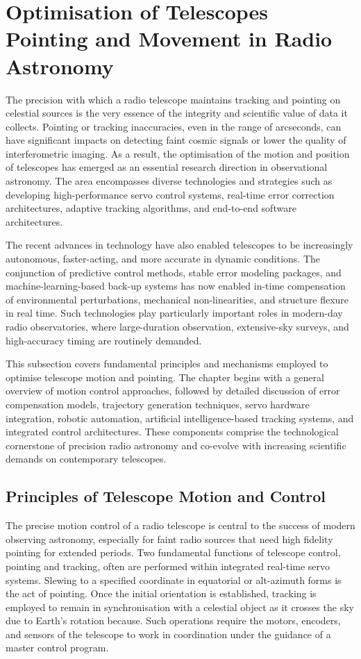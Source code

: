 \section{Optimisation of Telescopes Pointing and Movement in Radio Astronomy}
The precision with which a radio telescope maintains tracking and pointing on celestial sources is the very essence of the integrity and scientific value of data it collects. Pointing or tracking inaccuracies, even in the range of arcseconds, can have significant impacts on detecting faint cosmic signals or lower the quality of interferometric imaging. As a result, the optimisation of the motion and position of telescopes has emerged as an essential research direction in observational astronomy. The area encompasses diverse technologies and strategies such as developing high-performance servo control systems, real-time error correction architectures, adaptive tracking algorithms, and end-to-end software architectures.

The recent advances in technology have also enabled telescopes to be increasingly autonomous, faster-acting, and more accurate in dynamic conditions. The conjunction of predictive control methods, stable error modeling packages, and machine-learning-based back-up systems has now enabled in-time compensation of environmental perturbations, mechanical non-linearities, and structure flexure in real time. Such technologies play particularly important roles in modern-day radio observatories, where large-duration observation, extensive-sky surveys, and high-accuracy timing are routinely demanded.

This subsection covers fundamental principles and mechanisms employed to optimise telescope motion and pointing. The chapter begins with a general overview of motion control approaches, followed by detailed discussion of error compensation models, trajectory generation techniques, servo hardware integration, robotic automation, artificial intelligence-based tracking systems, and integrated control architectures. These components comprise the technological cornerstone of precision radio astronomy and co-evolve with increasing scientific demands on contemporary telescopes.

    \subsection{Principles of Telescope Motion and Control}
    The precise motion control of a radio telescope is central to the success of modern observing astronomy, especially for faint radio sources that need high fidelity pointing for extended periods. Two fundamental functions of telescope control, pointing and tracking, often are performed within integrated real-time servo systems. Slewing to a specified coordinate in equatorial or alt-azimuth forms is the act of pointing. Once the initial orientation is established, tracking is employed to remain in synchronisation with a celestial object as it crosses the sky due to Earth's rotation because. Such operations require the motors, encoders, and sensors of the telescope to work in coordination under the guidance of a master control program.

